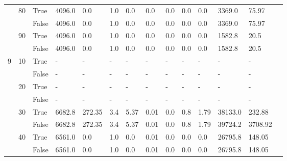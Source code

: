 \begin{appendices}
\begin{landscape}
\begin{small}
\begin{longtable}[c]{@{}lll|ll|ll|ll|ll|lll@{}}
   & 80 & True  & 4096.0          & 0.0            & 1.0           & 0.0           & 0.0           & 0.0           & 0.0           & 0.0           & 3369.0        & 75.97       &  \\
   &    & False & 4096.0          & 0.0            & 1.0           & 0.0           & 0.0           & 0.0           & 0.0           & 0.0           & 3369.0        & 75.97       &  \\
   & 90 & True  & 4096.0          & 0.0            & 1.0           & 0.0           & 0.0           & 0.0           & 0.0           & 0.0           & 1582.8        & 20.5        &  \\
   &    & False & 4096.0          & 0.0            & 1.0           & 0.0           & 0.0           & 0.0           & 0.0           & 0.0           & 1582.8        & 20.5        &  \\
  \midrule
9  & 10 & True  & -               & -              & -             & -             & -             & -             & -             & -             & -             & -           &  \\
   &    & False & -               & -              & -             & -             & -             & -             & -             & -             & -             & -           &  \\
   & 20 & True  & -               & -              & -             & -             & -             & -             & -             & -             & -             & -           &  \\
   &    & False & -               & -              & -             & -             & -             & -             & -             & -             & -             & -           &  \\
   & 30 & True  & 6682.8          & 272.35         & 3.4           & 5.37          & 0.01          & 0.0           & 0.8           & 1.79          & 38133.0       & 232.88      &  \\
   &    & False & 6682.8          & 272.35         & 3.4           & 5.37          & 0.01          & 0.0           & 0.8           & 1.79          & 39724.2       & 3708.92     &  \\
   & 40 & True  & 6561.0          & 0.0            & 1.0           & 0.0           & 0.01          & 0.0           & 0.0           & 0.0           & 26795.8       & 148.05      &  \\
   &    & False & 6561.0          & 0.0            & 1.0           & 0.0           & 0.01          & 0.0           & 0.0           & 0.0           & 26795.8       & 148.05      &  \\

\end{longtable}
\end{small}
\end{landscape}
\end{appendices}
